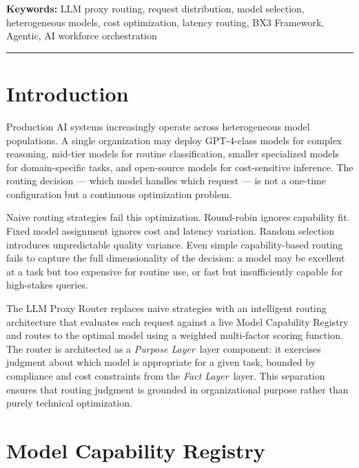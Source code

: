 \documentclass[12pt]{article}
\newcommand{\purpose}{\textit{Purpose Layer}}
\newcommand{\fact}{\textit{Fact Layer}}
\begin{document}
\vspace{0.5em}
\noindent\textbf{Keywords:} LLM proxy routing, request distribution, model selection, heterogeneous models, cost optimization, latency routing, BX3 Framework, Agentic, AI workforce orchestration

\vspace{1em}
\hrule
\vspace{1em}

\onehalfspacing

\section{Introduction}
\label{sec:intro}

Production AI systems increasingly operate across heterogeneous model populations. A single organization may deploy GPT-4-class models for complex reasoning, mid-tier models for routine classification, smaller specialized models for domain-specific tasks, and open-source models for cost-sensitive inference. The routing decision — which model handles which request — is not a one-time configuration but a continuous optimization problem.

Naive routing strategies fail this optimization. Round-robin ignores capability fit. Fixed model assignment ignores cost and latency variation. Random selection introduces unpredictable quality variance. Even simple capability-based routing fails to capture the full dimensionality of the decision: a model may be excellent at a task but too expensive for routine use, or fast but insufficiently capable for high-stakes queries.

The LLM Proxy Router replaces naive strategies with an intelligent routing architecture that evaluates each request against a live Model Capability Registry and routes to the optimal model using a weighted multi-factor scoring function. The router is architected as a \purpose\ layer component: it exercises judgment about which model is appropriate for a given task, bounded by compliance and cost constraints from the \fact\ layer. This separation ensures that routing judgment is grounded in organizational purpose rather than purely technical optimization.

\section{Model Capability Registry}
\label{sec:registry}
\end{document}
